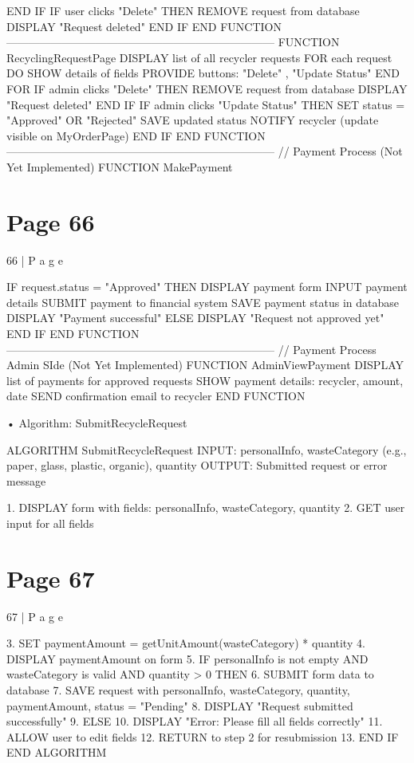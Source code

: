 \documentclass{article}
\begin{document}
    END IF 
    IF user clicks "Delete" THEN 
        REMOVE request from database 
        DISPLAY "Request deleted" 
    END IF 
END FUNCTION 
------------------------------------------------------------------------ 
FUNCTION RecyclingRequestPage 
    DISPLAY list of all recycler requests 
    FOR each request DO 
        SHOW details of fields 
        PROVIDE buttons: "Delete" , "Update Status" 
    END FOR 
    IF admin clicks "Delete" THEN 
        REMOVE request from database 
        DISPLAY "Request deleted" 
    END IF 
    IF admin clicks "Update Status" THEN 
        SET status = "Approved" OR "Rejected" 
        SAVE updated status 
        NOTIFY recycler (update visible on MyOrderPage) 
    END IF 
END FUNCTION 
------------------------------------------------------------------------ 
// Payment Process (Not Yet Implemented) 
FUNCTION MakePayment 

\section*{Page 66}
66 | P a g e 
 
    IF request.status = "Approved" THEN 
        DISPLAY payment form 
        INPUT payment details 
        SUBMIT payment to financial system 
        SAVE payment status in database 
        DISPLAY "Payment successful" 
    ELSE 
        DISPLAY "Request not approved yet" 
    END IF 
END FUNCTION 
------------------------------------------------------------------------ 
// Payment Process Admin SIde (Not Yet Implemented) 
FUNCTION AdminViewPayment 
    DISPLAY list of payments for approved requests 
    SHOW payment details: recycler, amount, date 
    SEND confirmation email to recycler 
END FUNCTION 
 
• Algorithm: SubmitRecycleRequest 
 
ALGORITHM SubmitRecycleRequest 
INPUT: personalInfo, wasteCategory (e.g., paper, glass, plastic, organic), quantity 
OUTPUT: Submitted request or error message 
  
1. DISPLAY form with fields: personalInfo, wasteCategory, quantity 
2. GET user input for all fields 

\section*{Page 67}
67 | P a g e 
 
3. SET paymentAmount = getUnitAmount(wasteCategory) * quantity 
4. DISPLAY paymentAmount on form 
5. IF personalInfo is not empty AND wasteCategory is valid AND quantity > 0 THEN 
    6. SUBMIT form data to database 
    7. SAVE request with personalInfo, wasteCategory, quantity, paymentAmount, status = 
"Pending" 
    8. DISPLAY "Request submitted successfully" 
9. ELSE 
    10. DISPLAY "Error: Please fill all fields correctly" 
    11. ALLOW user to edit fields 
    12. RETURN to step 2 for resubmission 
13. END IF 
END ALGORITHM 
 
\end{document}
